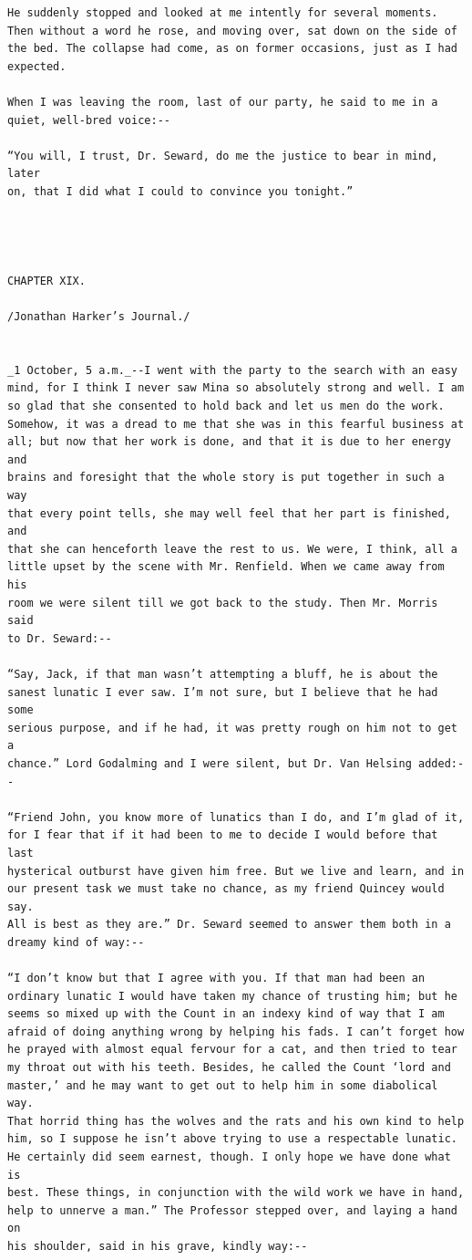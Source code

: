 \documentclass{article}
\begin{document}
\begin{verbatim}
He suddenly stopped and looked at me intently for several moments.
Then without a word he rose, and moving over, sat down on the side of
the bed. The collapse had come, as on former occasions, just as I had
expected.

When I was leaving the room, last of our party, he said to me in a
quiet, well-bred voice:--

“You will, I trust, Dr. Seward, do me the justice to bear in mind, later
on, that I did what I could to convince you tonight.”




CHAPTER XIX.

/Jonathan Harker’s Journal./


_1 October, 5 a.m._--I went with the party to the search with an easy
mind, for I think I never saw Mina so absolutely strong and well. I am
so glad that she consented to hold back and let us men do the work.
Somehow, it was a dread to me that she was in this fearful business at
all; but now that her work is done, and that it is due to her energy and
brains and foresight that the whole story is put together in such a way
that every point tells, she may well feel that her part is finished, and
that she can henceforth leave the rest to us. We were, I think, all a
little upset by the scene with Mr. Renfield. When we came away from his
room we were silent till we got back to the study. Then Mr. Morris said
to Dr. Seward:--

“Say, Jack, if that man wasn’t attempting a bluff, he is about the
sanest lunatic I ever saw. I’m not sure, but I believe that he had some
serious purpose, and if he had, it was pretty rough on him not to get a
chance.” Lord Godalming and I were silent, but Dr. Van Helsing added:--

“Friend John, you know more of lunatics than I do, and I’m glad of it,
for I fear that if it had been to me to decide I would before that last
hysterical outburst have given him free. But we live and learn, and in
our present task we must take no chance, as my friend Quincey would say.
All is best as they are.” Dr. Seward seemed to answer them both in a
dreamy kind of way:--

“I don’t know but that I agree with you. If that man had been an
ordinary lunatic I would have taken my chance of trusting him; but he
seems so mixed up with the Count in an indexy kind of way that I am
afraid of doing anything wrong by helping his fads. I can’t forget how
he prayed with almost equal fervour for a cat, and then tried to tear
my throat out with his teeth. Besides, he called the Count ‘lord and
master,’ and he may want to get out to help him in some diabolical way.
That horrid thing has the wolves and the rats and his own kind to help
him, so I suppose he isn’t above trying to use a respectable lunatic.
He certainly did seem earnest, though. I only hope we have done what is
best. These things, in conjunction with the wild work we have in hand,
help to unnerve a man.” The Professor stepped over, and laying a hand on
his shoulder, said in his grave, kindly way:--


\end{verbatim}
\end{document}
